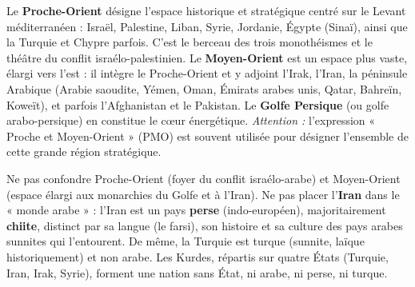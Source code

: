 \documentclass[11pt]{article}
\newcommand{\cle}[1]{{\popxbold\color{popdark}#1}}
\begin{document}
\begin{definition}
Le \textbf{Proche-Orient} désigne l'espace historique et stratégique centré sur le Levant méditerranéen : Israël, Palestine, Liban, Syrie, Jordanie, Égypte (Sinaï), ainsi que la Turquie et Chypre parfois. C'est le berceau des trois monothéismes et le théâtre du conflit israélo-palestinien.
Le \textbf{Moyen-Orient} est un espace plus vaste, élargi vers l'est : il intègre le Proche-Orient et y adjoint l'Irak, l'Iran, la péninsule Arabique (Arabie saoudite, Yémen, Oman, Émirats arabes unis, Qatar, Bahreïn, Koweït), et parfois l'Afghanistan et le Pakistan. Le \textbf{Golfe Persique} (ou golfe arabo-persique) en constitue le cœur énergétique.
\emph{Attention :} l'expression « Proche et Moyen-Orient » (PMO) est souvent utilisée pour désigner l'ensemble de cette grande région stratégique.
\end{definition}

\begin{attention}
Ne pas confondre \cle{Proche-Orient} (foyer du conflit israélo-arabe) et \cle{Moyen-Orient} (espace élargi aux monarchies du Golfe et à l'Iran).
Ne pas placer l'\textbf{Iran} dans le « monde arabe » : l'Iran est un pays \textbf{perse} (indo-européen), majoritairement \textbf{chiite}, distinct par sa langue (le farsi), son histoire et sa culture des pays arabes sunnites qui l'entourent. De même, la Turquie est turque (sunnite, laïque historiquement) et non arabe. Les Kurdes, répartis sur quatre États (Turquie, Iran, Irak, Syrie), forment une nation sans État, ni arabe, ni perse, ni turque.
\end{attention}
\end{document}
